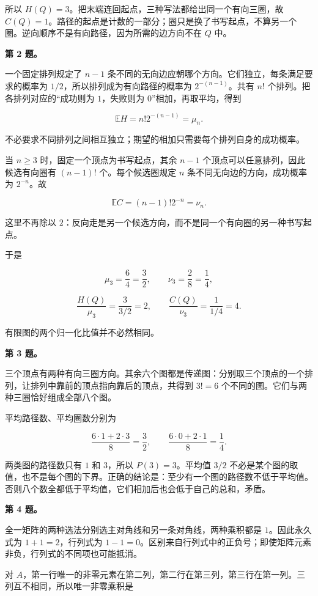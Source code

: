 \documentclass[11pt,a4paper]{article}
\begin{document}
所以 \(H(Q)=3\)。把末端连回起点，三种写法都给出同一个有向三圈，故 \(C(Q)=1\)。路径的起点是计数的一部分；圈只是换了书写起点，不算另一个圈。逆向顺序不是有向路径，因为所需的边方向不在 \(Q\) 中。

\textbf{第 2 题。}

一个固定排列规定了 \(n-1\) 条不同的无向边应朝哪个方向。它们独立，每条满足要求的概率为 \(1/2\)，所以排列成为有向路径的概率为 \(2^{-(n-1)}\)。共有 \(n!\) 个排列。把各排列对应的``成功则为 \(1\)，失败则为 \(0\)''相加，再取平均，得到

\[\mathbb EH=n!2^{-(n-1)}=\mu_n.\]

不必要求不同排列之间相互独立；期望的相加只需要每个排列自身的成功概率。

当 \(n\ge3\) 时，固定一个顶点为书写起点，其余 \(n-1\) 个顶点可以任意排列，因此候选有向圈有 \((n-1)!\) 个。每个候选圈规定 \(n\) 条不同无向边的方向，成功概率为 \(2^{-n}\)。故

\[\mathbb EC=(n-1)!2^{-n}=\nu_n.\]

这里不再除以 \(2\)：反向走是另一个候选方向，而不是同一个有向圈的另一种书写起点。

于是

\[\mu_3=\frac{6}{4}=\frac32,\qquad
\nu_3=\frac28=\frac14,\]

\[\frac{H(Q)}{\mu_3}=\frac3{3/2}=2,\qquad
\frac{C(Q)}{\nu_3}=\frac1{1/4}=4.\]

有限图的两个归一化比值并不必然相同。

\textbf{第 3 题。}

三个顶点有两种有向三圈方向。其余六个图都是传递图：分别取三个顶点的一个排列，让排列中靠前的顶点指向靠后的顶点，共得到 \(3!=6\) 个不同的图。它们与两种三圈恰好组成全部八个图。

平均路径数、平均圈数分别为

\[\frac{6\cdot1+2\cdot3}{8}=\frac32,
\qquad
\frac{6\cdot0+2\cdot1}{8}=\frac14.\]

两类图的路径数只有 \(1\) 和 \(3\)，所以 \(P(3)=3\)。平均值 \(3/2\) 不必是某个图的取值，也不是每个图的下界。正确的结论是：至少有一个图的路径数不低于平均值。否则八个数全都低于平均值，它们相加后也会低于自己的总和，矛盾。

\textbf{第 4 题。}

全一矩阵的两种选法分别选主对角线和另一条对角线，两种乘积都是 \(1\)。因此永久式为 \(1+1=2\)，行列式为 \(1-1=0\)。区别来自行列式中的正负号；即使矩阵元素非负，行列式的不同项也可能抵消。

对 \(A\)，第一行唯一的非零元素在第二列，第二行在第三列，第三行在第一列。三列互不相同，所以唯一非零乘积是
\end{document}
